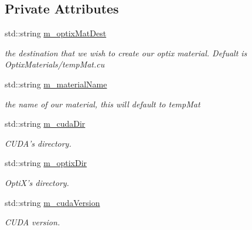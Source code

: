 \subsection*{Private Attributes}
\begin{DoxyCompactItemize}
\item 
\hypertarget{class_o_s_l_nodes_editor_a0627066cf0707571edbfbf9c5421ec44}{std\-::string \hyperlink{class_o_s_l_nodes_editor_a0627066cf0707571edbfbf9c5421ec44}{m\-\_\-optix\-Mat\-Dest}}\label{class_o_s_l_nodes_editor_a0627066cf0707571edbfbf9c5421ec44}

\begin{DoxyCompactList}\small\item\em the destination that we wish to create our optix material. Defualt is Optix\-Materials/temp\-Mat.\-cu \end{DoxyCompactList}\item 
\hypertarget{class_o_s_l_nodes_editor_aa051d19170023ebf57f6c79a5dc490e9}{std\-::string \hyperlink{class_o_s_l_nodes_editor_aa051d19170023ebf57f6c79a5dc490e9}{m\-\_\-material\-Name}}\label{class_o_s_l_nodes_editor_aa051d19170023ebf57f6c79a5dc490e9}

\begin{DoxyCompactList}\small\item\em the name of our material, this will default to temp\-Mat \end{DoxyCompactList}\item 
\hypertarget{class_o_s_l_nodes_editor_af0ee4bce62b2365bfe20956a0080c2ba}{std\-::string \hyperlink{class_o_s_l_nodes_editor_af0ee4bce62b2365bfe20956a0080c2ba}{m\-\_\-cuda\-Dir}}\label{class_o_s_l_nodes_editor_af0ee4bce62b2365bfe20956a0080c2ba}

\begin{DoxyCompactList}\small\item\em C\-U\-D\-A's directory. \end{DoxyCompactList}\item 
\hypertarget{class_o_s_l_nodes_editor_a2c629326a2a6b08331588434828a27e8}{std\-::string \hyperlink{class_o_s_l_nodes_editor_a2c629326a2a6b08331588434828a27e8}{m\-\_\-optix\-Dir}}\label{class_o_s_l_nodes_editor_a2c629326a2a6b08331588434828a27e8}

\begin{DoxyCompactList}\small\item\em Opti\-X's directory. \end{DoxyCompactList}\item 
\hypertarget{class_o_s_l_nodes_editor_a199c1da6a74b718cfcb2b9756d11d155}{std\-::string \hyperlink{class_o_s_l_nodes_editor_a199c1da6a74b718cfcb2b9756d11d155}{m\-\_\-cuda\-Version}}\label{class_o_s_l_nodes_editor_a199c1da6a74b718cfcb2b9756d11d155}

\begin{DoxyCompactList}\small\item\em C\-U\-D\-A version. \end{DoxyCompactList}\end{DoxyCompactItemize}

